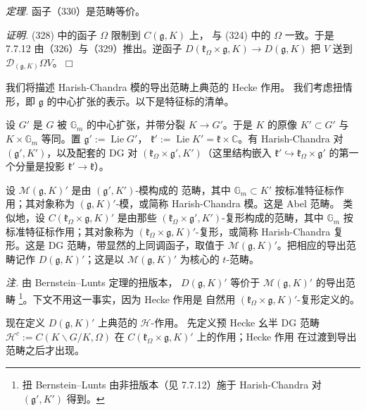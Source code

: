 
 \emph{定理.} 函子（330）是范畴等价。

\emph{证明.} (328) 中的函子 $\Omega$ 限制到 $C(\mathfrak{g},K)$ 上，
与 (324) 中的 $\Omega$ 一致。于是 7.7.12 由（326）与（329）推出。逆函子
$D(\mathfrak{k}_\Omega\times\mathfrak{g},K)\to D(\mathfrak{g},K)$ 把 $V$
送到 $\mathcal{D}_{(\mathfrak{g},K)}\Omega V$。\hfill$\Box$


 我们将描述 Harish-Chandra 模的导出范畴上典范的 Hecke 作用。
我们考虑扭情形，即 $\mathfrak{g}$ 的中心扩张的表示。以下是特征标的清单。

设 $G'$ 是 $G$ 被 $\mathbb{G}_m$ 的中心扩张，并带分裂 $K\to G'$。于是
$K$ 的原像 $K'\subset G'$ 与 $K\times\mathbb{G}_m$ 等同。置
$\mathfrak{g}':=\operatorname{Lie}G'$，
$\mathfrak{k}':=\operatorname{Lie}K'
=\mathfrak{k}\times\mathbb{C}$。有 Harish-Chandra 对
$(\mathfrak{g}',K')$，以及配套的 DG 对
$(\mathfrak{k}_\Omega\times\mathfrak{g}',K')$（这里结构嵌入
$\mathfrak{k}'\hookrightarrow
\mathfrak{k}_\Omega\times\mathfrak{g}'$ 的第一个分量是投影
$\mathfrak{k}'\to\mathfrak{k}$）。

设 $\mathcal{M}(\mathfrak{g},K)'$ 是由 $(\mathfrak{g}',K')$-模构成的
范畴，其中 $\mathbb{G}_m\subset K'$ 按标准特征标作用；其对象称为
$(\mathfrak{g},K)'$-模，或简称 Harish-Chandra 模。这是 Abel 范畴。
类似地，设 $C(\mathfrak{k}_\Omega\times\mathfrak{g},K)'$ 是由那些
$(\mathfrak{k}_\Omega\times\mathfrak{g}',K')$-复形构成的范畴，其中
$\mathbb{G}_m$ 按标准特征标作用；其对象称为
$(\mathfrak{k}_\Omega\times\mathfrak{g},K)'$-复形，或简称
Harish-Chandra 复形。这是 DG 范畴，带显然的上同调函子，取值于
$\mathcal{M}(\mathfrak{g},K)'$。把相应的导出范畴记作
$D(\mathfrak{g},K)'$；这是以 $\mathcal{M}(\mathfrak{g},K)'$ 为核心的
$t$-范畴。

\emph{注.} 由 Bernstein--Lunts 定理的扭版本，
$D(\mathfrak{g},K)'$ 等价于 $\mathcal{M}(\mathfrak{g},K)'$ 的导出范畴
\footnote{扭 Bernstein--Lunts 由非扭版本（见 7.7.12）施于 Harish-Chandra
对 $(\mathfrak{g}',K')$ 得到。}。下文不用这一事实，因为 Hecke 作用是
自然用 $(\mathfrak{k}_\Omega\times\mathfrak{g},K)'$-复形定义的。


 现在定义 $D(\mathfrak{g},K)'$ 上典范的 $\mathcal{H}$-作用。
先定义预 Hecke 幺半 DG 范畴 $\mathcal{H}^c:=C(K\backslash G/K,\Omega)$
在 $C(\mathfrak{k}_\Omega\times\mathfrak{g},K)'$ 上的作用；Hecke 作用
在过渡到导出范畴之后才出现。

